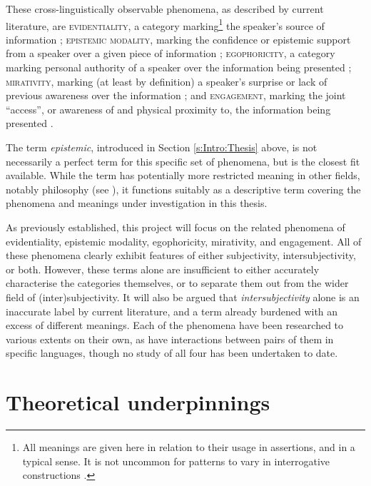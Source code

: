 These cross-linguistically observable phenomena, as described by current literature, are \textsc{evidentiality}, a category marking\footnote{All meanings are given here in relation to their usage in assertions, and in a typical sense. It is not uncommon for patterns to vary in interrogative constructions \cite{Aikhenvald2018Intro}.} the speaker's source of information \cite{SanRoque2019Evidentiality}; \textsc{epistemic modality}, marking the confidence or epistemic support from a speaker over a given piece of information \cite{Boye2012}; \textsc{egophoricity}, a category marking personal authority of a speaker over the information being presented \cite{EgoIntro}; \textsc{mirativity}, marking (at least by definition) a speaker's surprise or lack of previous awareness over the information \cite{DeLancey2012}; and \textsc{engagement}, marking the joint ``access'', or awareness of and physical proximity to, the information being presented \cites{EvansBergqvistSanRoque2018a}{EvansBergqvistSanRoque2018b}.

The term \textit{epistemic}, introduced in Section \ref{s:Intro:Thesis} above, is not necessarily a perfect term for this specific set of phenomena, but is the closest fit available. While the term has potentially more restricted meaning in other fields, notably philosophy (see ), it functions suitably as a descriptive term covering the phenomena and meanings under investigation in this thesis. 

As previously established, this project will focus on the related phenomena of evidentiality, epistemic modality, egophoricity, mirativity, and engagement. All of these phenomena clearly exhibit features of either subjectivity, intersubjectivity, or both. However, these terms alone are insufficient to either accurately characterise the categories themselves, or to separate them out from the wider field of (inter)subjectivity. It will also be argued that \textit{intersubjectivity} alone is an inaccurate label by current literature, and a term already burdened with an excess of different meanings. Each of the phenomena have been researched to various extents on their own, as have interactions between pairs of them in specific languages, though no study of all four has been undertaken to date.

\section{Theoretical underpinnings}\label{s:Intro:Theory}
